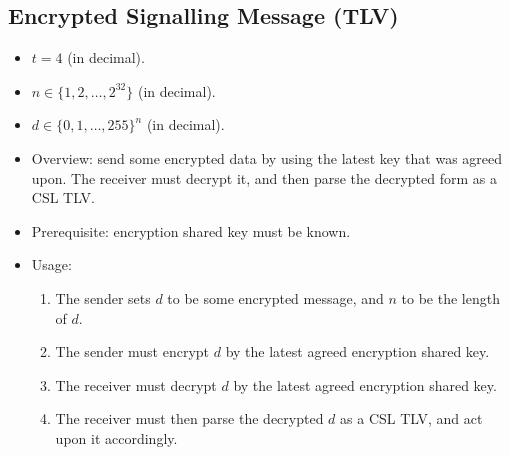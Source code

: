 \documentclass{article}
\begin{document}
\subsection{Encrypted Signalling Message (TLV)}
\begin{itemize}
    \item $t = 4$ (in decimal).
    \item $n \in \{1,2,\ldots,2^{32}\}$ (in decimal).
    \item $d \in \{0,1,\ldots,255\}^n$ (in decimal).
    \item Overview: send some encrypted data by using the latest key that was
    agreed upon. The receiver must decrypt it, and then parse the decrypted
    form as a CSL TLV.
    \item Prerequisite: encryption shared key must be known.
    \item Usage:
        \begin{enumerate}
            \item The sender sets $d$ to be some encrypted message, and $n$ to
            be the length of $d$.
            \item The sender must encrypt $d$ by the latest agreed encryption
            shared key.
            \item The receiver must decrypt $d$ by the latest agreed encryption
            shared key.
            \item The receiver must then parse the decrypted $d$ as a CSL TLV,
            and act upon it accordingly.
        \end{enumerate}
\end{itemize}
\end{document}
